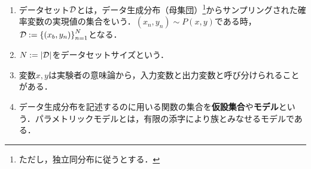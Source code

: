 \documentclass[uplatex,dvipdfmx]{jsreport}
\begin{document}
\begin{definition}\mbox{}
    \begin{enumerate}
        \item データセット$\mathcal{D}$とは，データ生成分布（母集団）\footnote{ただし，独立同分布に従うとする．}からサンプリングされた確率変数の実現値の集合をいう．$(x_n,y_n)\sim P(x,y)$である時，$\mathcal{D}:=\left\{(x_b,y_n)\right\}_{n=1}^N$となる．
        \item $N:=\lvert\mathcal{D}\rvert$をデータセットサイズという．
        \item 変数$x,y$は実験者の意味論から，入力変数と出力変数と呼び分けられることがある．
        \item データ生成分布を記述するのに用いる関数の集合を\textbf{仮設集合}や\textbf{モデル}という．パラメトリックモデルとは，有限の添字により族とみなせるモデルである．
    \end{enumerate}
\end{definition}
\end{document}

